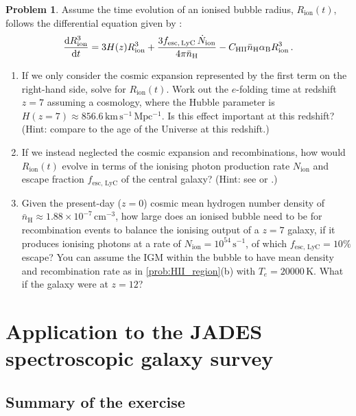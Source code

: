 \documentclass{article}
\theoremstyle{definition}
\newtheorem{problem}{Problem}[section]
\begin{document}
\begin{problem}
    \label{prob:bubble_radius_evolution}
    Assume the time evolution of an ionised bubble radius, $R_\text{ion}(t)$, follows the differential equation given by \citet{2000ApJ...542L..75C}:
    \begin{equation}
        \frac{\dif R_\mathrm{ion}^3}{\dif t} = 3 H(z) R_\mathrm{ion}^3 + \frac{3 f_\mathrm{esc, \, LyC} \, \dot{N}_\mathrm{ion}}{4\pi \bar{n}_\mathrm{H}} - C_\mathrm{HII} \bar{n}_\mathrm{H} \alpha_\mathrm{B} R_\mathrm{ion}^3 \, .
    \end{equation}
    \begin{enumerate}[label=(\alph*)]
        \item If we only consider the cosmic expansion represented by the first term on the right-hand side, solve for $R_\text{ion}(t)$. Work out the $e$-folding time at redshift $z = 7$ assuming a \citet{2020A&A...641A...6P} cosmology, where the Hubble parameter is $H(z=7) \approx 856.6 \, \mathrm{km \, s^{-1} \, Mpc^{-1}}$. Is this effect important at this redshift? (Hint: compare to the age of the Universe at this redshift.)
        \item If we instead neglected the cosmic expansion and recombinations, how would $R_\text{ion}(t)$ evolve in terms of the ionising photon production rate $N_\text{ion}$ and escape fraction $f_\text{esc, LyC}$ of the central galaxy? (Hint: see \citet{2020MNRAS.499.1395M} or \citet{2024A&A...682A..40W}.)
        \item Given the present-day ($z = 0$) cosmic mean hydrogen number density of $\bar{n}_\text{H} \approx 1.88 \times 10^{-7} \, \mathrm{cm^{-3}}$, how large does an ionised bubble need to be for recombination events to balance the ionising output of a $z = 7$ galaxy, if it produces ionising photons at a rate of $N_\text{ion} = 10^{54} \, \mathrm{s^{-1}}$, of which $f_\text{esc, LyC} = 10\%$ escape? You can assume the IGM within the bubble to have mean density and recombination rate as in \cref{prob:HII_region}(b) with $T_e = \num{20000} \, \mathrm{K}$. What if the galaxy were at $z = 12$?
    \end{enumerate}
\end{problem}

\section{Application to the JADES spectroscopic galaxy survey}

\subsection{Summary of the exercise}
\end{document}
